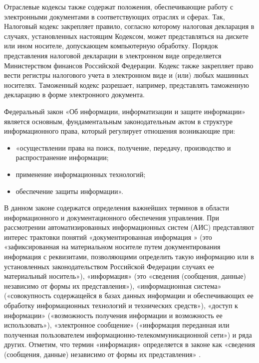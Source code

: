 Отраслевые кодексы также содержат положения, обеспечивающие работу с электронными документами в соответствующих отраслях и сферах. Так, Налоговый кодекс закрепляет правило, согласно которому налоговая декларация в случаях, установленных настоящим Кодексом, может представляться на дискете или ином носителе, допускающем компьютерную обработку. Порядок представления налоговой декларации в электронном виде определяется Министерством финансов Российской Федерации. Кодекс также закрепляет право вести регистры налогового учета в электронном виде и (или) любых машинных носителях. Таможенный кодекс разрешает, например, представлять таможенную декларацию в форме электронного документа.

Федеральный закон «Об информации, информатизации и защите информации»\cite{informlaw} является основным, фундаментальным законодательным актом в структуре информационного права, который регулирует отношения возникающие при: 
\begin{itemize}
	\item «осуществлении права на поиск, получение, передачу, производство и распространение информации;

	\item применение информационных технологий;

	\item обеспечение защиты информации».
\end{itemize}

В данном законе содержатся определения важнейших терминов в области информационного и документационного обеспечения управления. При рассмотрении автоматизированных информационных систем (АИС) представляют интерес трактовки понятий «документированная информация » (это «зафиксированная на материальном носителе путем документирования информация с реквизитами, позволяющими определить такую информацию или в установленных законодательством Российской Федерации случаях ее материальный носитель»), «информация» (это «сведения (сообщения, данные) независимо от формы их представления»), «информационная система» («совокупность содержащейся в базах данных информации и обеспечивающих ее обработку информационных технологий и технических средств»), «доступ к информации» («возможность получения информации и возможность ее использовать»), «электронное сообщение» («информация переданная или полученная пользователем информационно-телекоммуникационной сети») и ряда других. Отметим, что термин «информация» определяется в законе как «сведения (сообщения, данные) независимо от формы их представления» .

